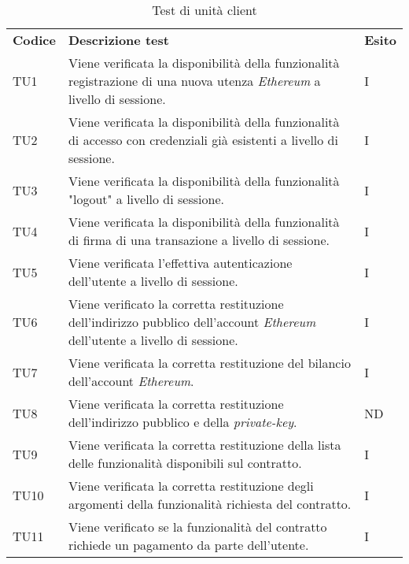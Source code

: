 \renewcommand{\arraystretch}{1.5}
\begin{longtable}{|C{1.5cm}|C{10cm}|C{1.5cm}|}
	
	\caption{Test di unità client}\\
	\hline
	
	\textbf{Codice} & \textbf{Descrizione test}  & \textbf{Esito}
	\tabularnewline
	\endfirsthead
	
	TU1 &
	Viene verificata la disponibilità della funzionalità registrazione di una nuova utenza \textit{Ethereum\glo} a livello di sessione.  &
	I \\
	
	TU2 &
	Viene verificata la disponibilità della funzionalità di accesso con credenziali già esistenti a livello di sessione.  &
	I \\
	
	TU3 &
	Viene verificata la disponibilità della funzionalità "logout" a livello di sessione.  &
	I \\
	
	TU4 &
	Viene verificata la disponibilità della funzionalità di firma di una transazione a livello di sessione.  &
	I \\
	
	TU5 &
	Viene verificata l'effettiva autenticazione dell'utente a livello di sessione.  &
	I \\
	
	TU6 &
	Viene verificato la corretta restituzione dell'indirizzo pubblico dell'account \textit{Ethereum\glo} dell'utente a livello di sessione.  &
	I \\
	
	TU7 &
	Viene verificata la corretta restituzione del bilancio dell'account \textit{Ethereum\glos}.  &
	I \\
	
	TU8 &
	Viene verificata la corretta restituzione dell'indirizzo pubblico e della \textit{private-key\glos}.  &
	ND \\
	
	TU9 &
	Viene verificata la corretta restituzione della lista delle funzionalità disponibili sul contratto.  &
	I \\
	
	TU10 &
	Viene verificata la corretta restituzione degli argomenti della funzionalità richiesta del contratto.  &
	I \\
	
	TU11 &
	Viene verificato se la funzionalità del contratto richiede un pagamento da parte dell'utente.  &
	I \\
	

\end{longtable}
